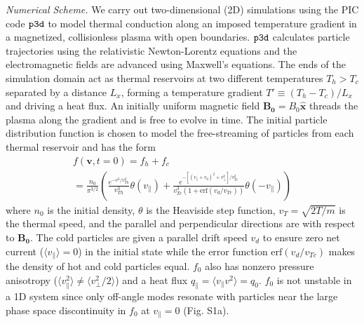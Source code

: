 \documentclass[%
 reprint,
superscriptaddress,
 amsmath,amssymb,
 aps,
]{revtex4-1}
\begin{document}
\textit{Numerical Scheme.} We carry out two-dimensional (2D)
simulations using the PIC code $\tt{p3d}$ \cite{Zeiler2002} to model
thermal conduction along an imposed temperature gradient in a
magnetized, collisionless plasma with open boundaries. $\tt{p3d}$
calculates particle trajectories using the relativistic Newton-Lorentz
equations and the electromagnetic fields are advanced using Maxwell's
equations. The ends of the simulation domain act as thermal reservoirs
at two different temperatures $T_{h} > T_{c}$ separated by a distance
$L_{x}$, forming a temperature gradient $T' \equiv
(T_{h}-T_{c})/L_{x}$ and driving a heat flux. An initially uniform
magnetic field $\mathbf{B_{0}}=B_{0} \mathbf{\hat{x}}$ threads the
plasma along the gradient and is free to evolve in time. The initial
particle distribution function is chosen to model the free-streaming
of particles from each thermal reservoir and has the form \small
\begin{multline}\label{eqn:1}
f(\mathbf{v},t=0) = f_{h} + f_{c} \\ = \frac{n_{0}}{\pi^{3/2}} \left( \frac{ e^{-v^2/v_{Th}^2}}{v_{Th}^3}\theta(v_{\parallel}) + \frac{e^{-[(v_{\parallel} + v_{d})^2 + v_{\perp}^2]/v_{Tc}^2}}{v_{Tc}^3(1+\text{erf}(v_{d}/v_{Tc}))}\theta(-v_{\parallel}) \right)
\end{multline}
\normalsize where $n_0$ is the initial density, $\theta$ is the
Heaviside step function, $v_{T}=\sqrt{2T/m}$ is the thermal speed, and
the parallel and perpendicular directions are with respect to
$\mathbf{B_0}$. The cold particles are given a parallel drift speed
$v_{d}$ to ensure zero net current ($\langle v_{\parallel} \rangle =
0$) in the initial state while the error function
$\text{erf}(v_{d}/v_{Tc})$ makes the density of hot and cold particles
equal. $f_0$ also has nonzero pressure anisotropy ($\langle
v_{\parallel}^2 \rangle \ne \langle v_{\perp}^{2}/2 \rangle$) and a
heat flux $q_{\parallel} =\langle v_{\parallel} v^2 \rangle =
q_{0}$. $f_0$ is not unstable in a 1D system since only off-angle
modes resonate with particles near the large phase space
discontinuity in $f_0$ at $v_{\parallel}=0$ (Fig. S1a).
\end{document}
